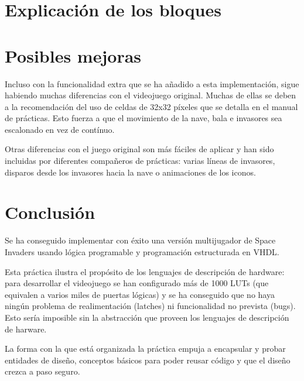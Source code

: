\documentclass[11pt]{article}
\begin{document}
\section{Explicación de los bloques}
\label{blocksexplanation}
%









\newpage
\section{Posibles mejoras}


Incluso con la funcionalidad extra que se ha añadido a esta implementación, sigue habiendo muchas diferencias con el videojuego original. Muchas de ellas se deben a la recomendación del uso de celdas de 32x32 píxeles que se detalla en el manual de prácticas. Esto fuerza a que el movimiento de la nave, bala e invasores sea escalonado en vez de contínuo.


Otras diferencias con el juego original son más fáciles de aplicar y han sido incluidas por diferentes compañeros de prácticas: varias líneas de invasores, disparos desde los invasores hacia la nave o animaciones de los iconos.

\section{Conclusión}

Se ha conseguido implementar con éxito una versión multijugador de Space Invaders usando lógica programable y programación estructurada en VHDL. 


Esta práctica ilustra el propósito de los lenguajes de descripción de hardware: para desarrollar el videojuego se han configurado más de 1000 LUTs (que equivalen a varios miles de puertas lógicas) y se ha conseguido que no haya ningún problema de realimentación (latches) ni funcionalidad no prevista (bugs). Esto sería imposible sin la abstracción que proveen los lenguajes de descripción de harware. 


La forma con la que está organizada la práctica empuja a encapsular y probar entidades de diseño, conceptos básicos para poder reusar código y que el diseño crezca a paso seguro.
%
\end{document}
